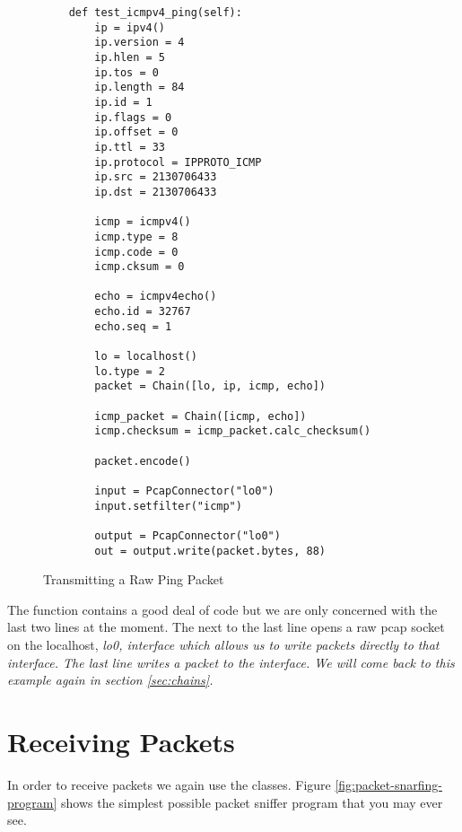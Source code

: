 \documentclass[11pt]{article}
\begin{document}
\begin{figure}
  \centering
\begin{verbatim}
    def test_icmpv4_ping(self):
        ip = ipv4()
        ip.version = 4
        ip.hlen = 5
        ip.tos = 0
        ip.length = 84
        ip.id = 1
        ip.flags = 0
        ip.offset = 0
        ip.ttl = 33
        ip.protocol = IPPROTO_ICMP
        ip.src = 2130706433
        ip.dst = 2130706433

        icmp = icmpv4()
        icmp.type = 8
        icmp.code = 0
        icmp.cksum = 0
        
        echo = icmpv4echo()
        echo.id = 32767
        echo.seq = 1

        lo = localhost()
        lo.type = 2
        packet = Chain([lo, ip, icmp, echo])
        
        icmp_packet = Chain([icmp, echo])
        icmp.checksum = icmp_packet.calc_checksum()

        packet.encode()

        input = PcapConnector("lo0")
        input.setfilter("icmp")

        output = PcapConnector("lo0")
        out = output.write(packet.bytes, 88)
\end{verbatim}
  \caption{Transmitting a Raw Ping Packet}
  \label{fig:transmitting-a-raw-ping-packet}
\end{figure}

The  function contains a good deal of code
but we are only concerned with the last two lines at the moment.  The
next to the last line opens a raw pcap socket on the localhost,
\em{lo0}, interface which allows us to write packets directly to that
interface.  The last line writes a packet to the interface.  We will
come back to this example again in section \ref{sec:chains}.

\section{Receiving Packets}
\label{sec:receiving-packets}

In order to receive packets we again use the 
classes.  Figure \ref{fig:packet-snarfing-program} shows the simplest
possible packet sniffer program that you may ever see.
\end{document}
